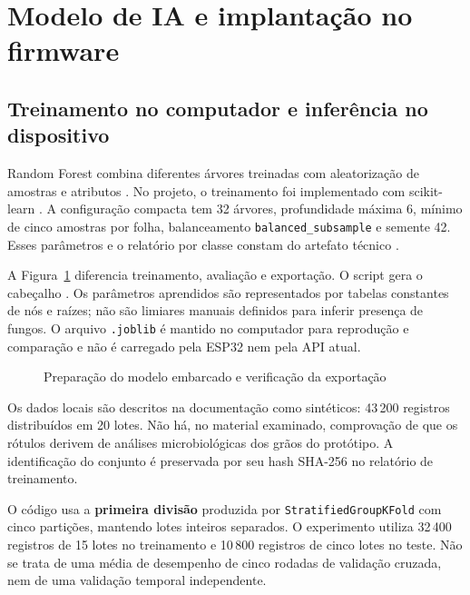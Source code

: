 \section{Modelo de IA e implantação no firmware}
\label{sec:modelo}

\subsection{Treinamento no computador e inferência no dispositivo}

Random Forest combina diferentes árvores treinadas com aleatorização
de amostras e atributos \cite{breiman2001}. No projeto, o treinamento
foi implementado com scikit-learn \cite{pedregosa2011}. A configuração
compacta tem 32 árvores, profundidade máxima 6, mínimo de cinco amostras
por folha, balanceamento \texttt{balanced\_subsample} e semente 42.
Esses parâmetros e o relatório por classe constam do artefato técnico
.

A Figura~\ref{fig:treinamento} diferencia treinamento, avaliação e
exportação. O script  gera o cabeçalho
. Os parâmetros aprendidos são
representados por tabelas constantes de nós e raízes; não são limiares
manuais definidos para inferir presença de fungos.
O arquivo \texttt{.joblib} é mantido no computador para reprodução e
comparação e não é carregado pela ESP32 nem pela API atual.

\begin{figure}[htbp]
\centering
\caption{Preparação do modelo embarcado e verificação da exportação}
\label{fig:treinamento}
\resizebox{0.96\textwidth}{!}{}
\end{figure}

Os dados locais são descritos na documentação como sintéticos: 43\,200
registros distribuídos em 20 lotes. Não há, no material examinado,
comprovação de que os rótulos derivem de análises microbiológicas
dos grãos do protótipo. A identificação do conjunto é preservada
por seu hash SHA-256 no relatório de treinamento.

O código usa a \textbf{primeira divisão} produzida por
\texttt{StratifiedGroupKFold} com cinco partições, mantendo lotes
inteiros separados. O experimento utiliza 32\,400 registros de 15
lotes no treinamento e 10\,800 registros de cinco lotes no teste.
Não se trata de uma média de desempenho de cinco rodadas de validação
cruzada, nem de uma validação temporal independente.

